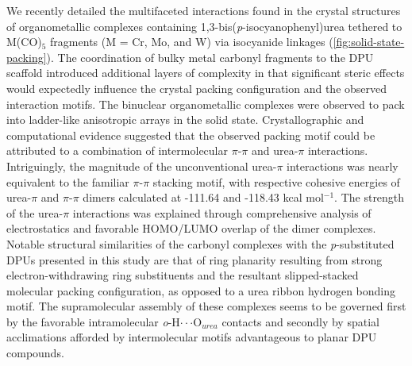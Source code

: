 We recently detailed the multifaceted interactions found in the crystal structures of organometallic complexes containing 1,3-bis(\textit{p}-isocyanophenyl)urea tethered to M(CO)$_{5}$ fragments (M = Cr, Mo, and W) via isocyanide linkages (\autoref{fig:solid-state-packing}). The coordination of bulky metal carbonyl fragments to the DPU scaffold introduced additional layers of complexity in that significant steric effects would expectedly influence the crystal packing configuration and the observed interaction motifs. The binuclear organometallic complexes were observed to pack into ladder-like anisotropic arrays in the solid state. Crystallographic and computational evidence suggested that the observed packing motif could be attributed to a combination of intermolecular $\pi$-$\pi$ and urea-$\pi$ interactions. Intriguingly, the magnitude of the unconventional urea-$\pi$ interactions was nearly equivalent to the familiar $\pi$-$\pi$ stacking motif, with respective cohesive energies of urea-$\pi$ and $\pi$-$\pi$ dimers calculated at -111.64 and -118.43 kcal mol$^{-1}$. The strength of the urea-$\pi$ interactions was explained through comprehensive analysis of electrostatics and favorable HOMO/LUMO overlap of the dimer complexes. Notable structural similarities of the carbonyl complexes with the \textit{p}-substituted DPUs presented in this study are that of ring planarity resulting from strong electron-withdrawing ring substituents and the resultant slipped-stacked molecular packing configuration, as opposed to a urea ribbon hydrogen bonding motif. The supramolecular assembly of these complexes seems to be governed first by the favorable intramolecular \textit{o}-H$\cdot \cdot \cdot$O$_{urea}$ contacts and secondly by spatial acclimations afforded by intermolecular motifs advantageous to planar DPU compounds.


